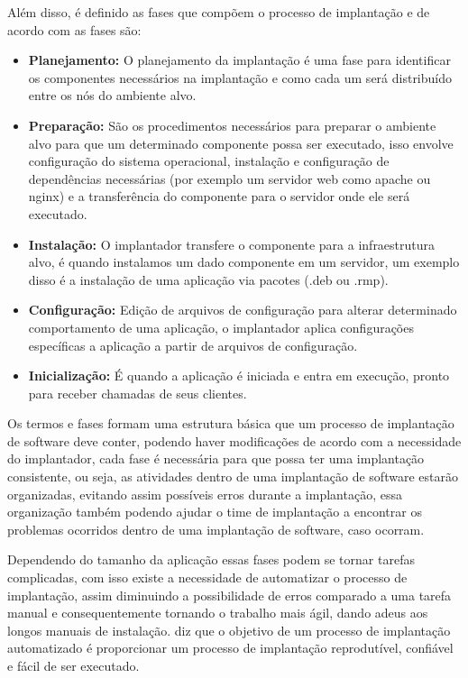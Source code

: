 Além disso, é definido as fases que compõem o processo de implantação e de acordo
com \cite{omg2006} as fases são:

\begin{itemize}
  \item  \textbf{Planejamento:} O planejamento da implantação é uma fase
  para identificar os componentes necessários na implantação e como cada um será
  distribuído entre os nós do ambiente alvo.
  \item  \textbf{Preparação:} São os procedimentos necessários para preparar o
  ambiente alvo para que um determinado componente possa ser executado, isso envolve
  configuração do sistema operacional, instalação e configuração de dependências
  necessárias (por exemplo um servidor web como apache ou nginx) e a transferência
  do componente para o servidor onde ele será executado.
  \item  \textbf{Instalação:} O implantador transfere o componente para a infraestrutura
  alvo, é quando instalamos um dado componente em um servidor, um exemplo disso
  é a instalação de uma aplicação via pacotes (.deb ou .rmp).
  \item  \textbf{Configuração:} Edição de arquivos de configuração para alterar
  determinado comportamento de uma aplicação, o implantador aplica configurações
  específicas a aplicação a partir de arquivos de configuração.
  \item  \textbf{Inicialização:} É quando a aplicação é iniciada e entra em execução,
  pronto para receber chamadas de seus clientes.
\end{itemize}

Os termos e fases formam uma estrutura básica que um processo de implantação de software
deve conter, podendo haver modificações de acordo com a necessidade do implantador,
cada fase é necessária para que possa ter uma implantação consistente, ou seja, as
atividades dentro de uma implantação de software estarão organizadas, evitando assim
possíveis erros durante a implantação, essa organização também podendo ajudar o
time de implantação a encontrar os problemas ocorridos dentro de uma implantação
de software, caso ocorram.

Dependendo do tamanho da aplicação essas fases podem se tornar tarefas complicadas,
com isso existe a necessidade de automatizar o processo de implantação, assim
diminuindo a possibilidade de erros comparado a uma tarefa manual e consequentemente
tornando o trabalho mais ágil, dando adeus aos longos manuais de instalação.
\cite{humble2010} diz que o objetivo de um processo de implantação automatizado é
proporcionar um processo de implantação reprodutível, confiável e fácil de ser
executado.

